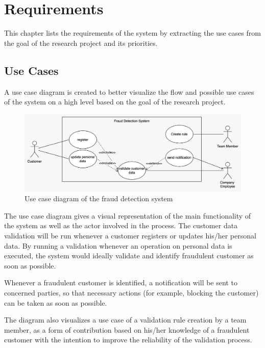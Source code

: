 \section{Requirements}

  This chapter lists the requirements of the system by extracting the use cases from the goal of the research project and its priorities. 

  \subsection{Use Cases}

    A use case diagram is created to better visualize the flow and possible use cases of the system on a high level based on the goal of the research project.

    \begin{figure}[!ht]
     \includegraphics[width=\textwidth]{diagrams/use-case.jpeg}
     \caption{Use case diagram of the fraud detection system}
     \label{fig:use_cases}
    \end{figure}

    The use case diagram gives a visual representation of the main functionality of the system as well as the actor involved in the process. The customer data validation will be run whenever a customer registers or updates his/her personal data. By running a validation whenever an operation on personal data is executed, the system would ideally validate and identify fraudulent customer as soon as possible. 
    
    Whenever a fraudulent customer is identified, a notification will be sent to concerned parties, so that necessary actions (for example, blocking the customer) can be taken as soon as possible. 

    The diagram also visualizes a use case of a validation rule creation by a team member, as a form of contribution based on his/her knowledge of a fraudulent customer with the intention to improve the reliability of the validation process.
    
